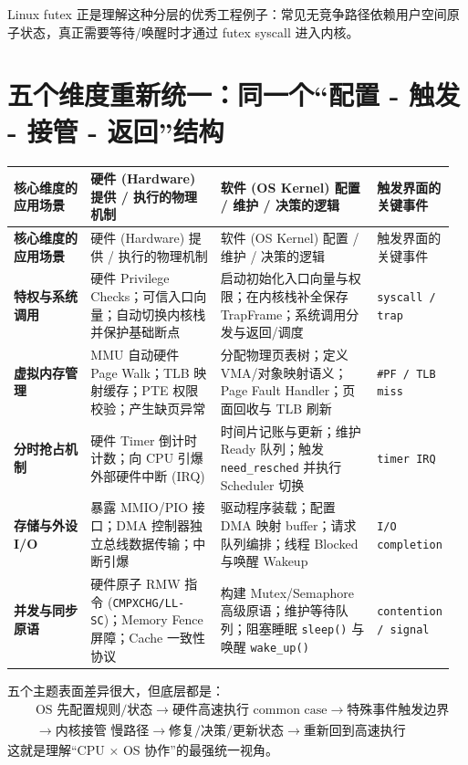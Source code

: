 \documentclass[11pt,a4paper]{ctexart}
\newcommand{\code}[1]{\texttt{#1}}
\begin{document}
Linux futex 正是理解这种分层的优秀工程例子：常见无竞争路径依赖用户空间原子状态，真正需要等待/唤醒时才通过 futex syscall 进入内核。

\section{五个维度重新统一：同一个“配置 - 触发 - 接管 - 返回”结构}

\begingroup
\small
\renewcommand{\arraystretch}{1.25}
\begin{longtable}{>{\bfseries}p{0.18\linewidth} p{0.3\linewidth} p{0.36\linewidth} p{0.12\linewidth}}
\toprule
核心维度的应用场景 & 硬件 (Hardware) 提供 / 执行的物理机制 & 软件 (OS Kernel) 配置 / 维护 / 决策的逻辑 & 触发界面的关键事件\\
\midrule
\endfirsthead
\toprule
核心维度的应用场景 & 硬件 (Hardware) 提供 / 执行的物理机制 & 软件 (OS Kernel) 配置 / 维护 / 决策的逻辑 & 触发界面的关键事件\\
\midrule
\endhead
特权与系统调用 & 硬件 Privilege Checks；可信入口向量；自动切换内核栈并保护基础断点 & 启动初始化入口向量与权限；在内核栈补全保存 TrapFrame；系统调用分发与返回/调度 & \code{syscall / trap}\\
虚拟内存管理 & MMU 自动硬件 Page Walk；TLB 映射缓存；PTE 权限校验；产生缺页异常 & 分配物理页表树；定义 VMA/对象映射语义；Page Fault Handler；页面回收与 TLB 刷新 & \code{\#PF / TLB miss}\\
分时抢占机制 & 硬件 Timer 倒计时计数；向 CPU 引爆外部硬件中断 (IRQ) & 时间片记账与更新；维护 Ready 队列；触发 \code{need\_resched} 并执行 Scheduler 切换 & \code{timer IRQ}\\
存储与外设 I/O & 暴露 MMIO/PIO 接口；DMA 控制器独立总线数据传输；中断引爆 & 驱动程序装载；配置 DMA 映射 buffer；请求队列编排；线程 Blocked 与唤醒 Wakeup & \code{I/O completion}\\
并发与同步原语 & 硬件原子 RMW 指令 (\code{CMPXCHG/LL-SC})；Memory Fence 屏障；Cache 一致性协议 & 构建 Mutex/Semaphore 高级原语；维护等待队列；阻塞睡眠 \code{sleep()} 与唤醒 \code{wake\_up()} & \code{contention / signal}\\
\bottomrule
\end{longtable}
\endgroup

\begin{corebox}[真正统一的结构]
五个主题表面差异很大，但底层都是：
\[
\boxed{
\begin{aligned}
&\text{OS 先配置规则/状态}\rightarrow\text{硬件高速执行 common case}\rightarrow\text{特殊事件触发边界}\\
&\rightarrow\text{内核接管 慢路径}\rightarrow\text{修复/决策/更新状态}\rightarrow\text{重新回到高速执行}
\end{aligned}
}
\]
这就是理解“CPU × OS 协作”的最强统一视角。
\end{corebox}
\end{document}
